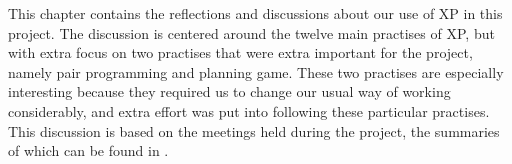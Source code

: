 This chapter contains the reflections and discussions about our use of XP in this project. The discussion is centered around the twelve main practises of XP, but with extra focus on two practises that were extra important for the project, namely pair programming and planning game. These two practises are especially interesting because they required us to change our usual way of working considerably, and extra effort was put into following these particular practises. This discussion is based on the meetings held during the project, the summaries of which can be found in .